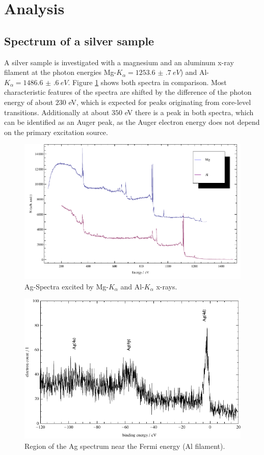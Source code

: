 \documentclass[a4paper]{scrartcl}
\numberwithin{equation}{section}
\numberwithin{figure}{section}
\numberwithin{table}{section}
\begin{document}
\clearpage
\section{Analysis}
\subsection{Spectrum of a silver sample}
A silver sample is investigated with a magnesium and an aluminum x-ray filament at the photon energies Mg-$K_\alpha=\SI{1253.6(7)}{eV}$) and Al-$K_\alpha=\SI{1486.6(6)}{eV}$. Figure \ref{fig:compare} shows both spectra in comparison. Most characteristic features of the spectra are shifted by the difference of the photon energy of about $230$ eV, which is expected for peaks originating from core-level transitions. Additionally at about $350$ eV there is a peak in both spectra, which can be identified as an Auger peak, as the Auger electron energy does not depend on the primary excitation source.

\begin{figure}
  \centering
   	\includegraphics[width=0.8\linewidth]{img/compare.pdf}
 \caption{\small Ag-Spectra excited by Mg-$K_\alpha$ and Al-$K_\alpha$ x-rays.  }
        \label{fig:compare}
\end{figure}

\begin{figure}
  \centering
   	\includegraphics[width=\linewidth]{img/AgAlFermi.pdf}
 \caption{\small Region of the Ag spectrum near the Fermi energy (Al filament).}
        \label{fig:agfermi}
\end{figure}
\end{document}
